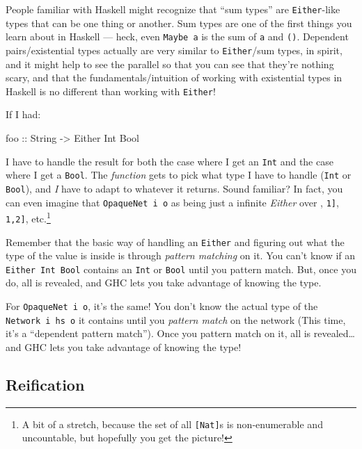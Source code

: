 \documentclass[]{article}
\newenvironment{Shaded}{}{}
\newcommand{\DataTypeTok}[1]{\textcolor[rgb]{0.56,0.13,0.00}{#1}}
\newcommand{\OtherTok}[1]{\textcolor[rgb]{0.00,0.44,0.13}{#1}}
\begin{document}
People familiar with Haskell might recognize that ``sum types'' are
\texttt{Either}-like types that can be one thing or another. Sum types are one
of the first things you learn about in Haskell --- heck, even \texttt{Maybe\ a}
is the sum of \texttt{a} and \texttt{()}. Dependent pairs/existential types
actually are very similar to \texttt{Either}/sum types, in spirit, and it might
help to see the parallel so that you can see that they're nothing scary, and
that the fundamentals/intuition of working with existential types in Haskell is
no different than working with \texttt{Either}!

If I had:

\begin{Shaded}
\begin{Highlighting}[]
\OtherTok{foo ::} \DataTypeTok{String} \OtherTok{{-}\textgreater{}} \DataTypeTok{Either} \DataTypeTok{Int} \DataTypeTok{Bool}
\end{Highlighting}
\end{Shaded}

I have to handle the result for both the case where I get an \texttt{Int} and
the case where I get a \texttt{Bool}. The \emph{function} gets to pick what type
I have to handle (\texttt{Int} or \texttt{Bool}), and \emph{I} have to adapt to
whatever it returns. Sound familiar? In fact, you can even imagine that
\texttt{OpaqueNet\ i\ o} as being just a infinite \emph{Either} over
\texttt{\textquotesingle{}{[}{]}}, \texttt{\textquotesingle{}{[}1{]}},
\texttt{\textquotesingle{}{[}1,2{]}}, etc.\footnote{A bit of a stretch, because
  the set of all \texttt{{[}Nat{]}}s is non-enumerable and uncountable, but
  hopefully you get the picture!}

Remember that the basic way of handling an \texttt{Either} and figuring out what
the type of the value is inside is through \emph{pattern matching} on it. You
can't know if an \texttt{Either\ Int\ Bool} contains an \texttt{Int} or
\texttt{Bool} until you pattern match. But, once you do, all is revealed, and
GHC lets you take advantage of knowing the type.

For \texttt{OpaqueNet\ i\ o}, it's the same! You don't know the actual type of
the \texttt{Network\ i\ hs\ o} it contains until you \emph{pattern match} on the
network (This time, it's a ``dependent pattern match''). Once you pattern match
on it, all is revealed\ldots and GHC lets you take advantage of knowing the
type!

\subsection{Reification}\label{reification}
\end{document}
